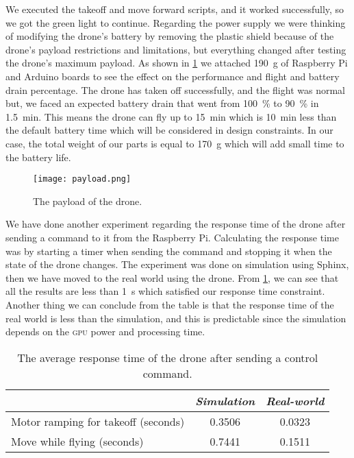 \documentclass[../main.tex]{subfiles}
\begin{document}
We executed the takeoff and move forward scripts,
and it worked successfully, so we got the green 
light to continue. 
Regarding the power supply we were thinking 
of modifying the drone's battery by removing the 
plastic shield because of the drone's payload restrictions 
and limitations, but everything changed after testing 
the drone's maximum payload. As shown in \cref{fig:payload}
we attached \SI{190}{\gram} of Raspberry Pi and Arduino boards
to see the effect on the performance and flight and
battery drain percentage. 
The drone has taken off  successfully, 
and the flight was normal but, we faced an expected 
battery drain that went from 
\SI{100}{\percent} to \SI{90}{\percent} in 
\SI{1.5}{\minute}.
This means the drone can fly up to 
\SI{15}{\minute} which is \SI{10}{\minute} 
less than the default battery time 
which will be considered in design constraints.
In our case, the total weight of our parts is equal
to \SI{170}{\gram} which will add small time
to the battery life.

\begin{figure}[bp]
	\centering
	\texttt{[image: payload.png]}
	\caption{The payload of the drone.}
	\label{fig:payload}
\end{figure} 


We have done another experiment regarding the response time 
of the drone after sending a command to it from the Raspberry Pi. 
Calculating the response time was by starting a timer when 
sending the command and stopping it when the 
state of the drone changes. 
The experiment was done on simulation using Sphinx,
then we have moved to the real world using the \anafi drone.
From \cref{tab:respone-time}, 
we can see that all the results are less than \SI{1}{\second}
which satisfied our response time constraint.
Another thing we can conclude from the table is that 
the response time of the real world is less than 
the simulation, and this is predictable since the simulation
depends on the \textsc{gpu} power and processing time. 

\begin{table}[tbp]
	\centering
	\caption{The average response time of the drone after sending a control command.}
	\label{tab:respone-time}
        \begin{tabularx}{0.7\textwidth}{ X c c }
		\toprule
		\textit{} & \textit{Simulation} & \textit{Real-world}\\ \midrule
		Motor ramping for takeoff (seconds)  & 0.3506 & 0.0323     \\
		Move while flying (seconds) & 0.7441  & 0.1511   \\
		\bottomrule
	\end{tabularx}
\end{table} 
\end{document}
